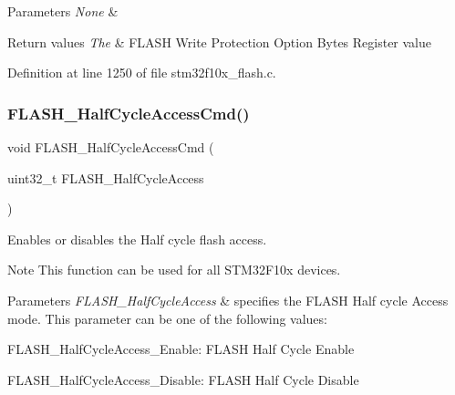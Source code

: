 \begin{DoxyParams}{Parameters}
{\em None} & \\
\hline
\end{DoxyParams}

\begin{DoxyRetVals}{Return values}
{\em The} & F\+L\+A\+SH Write Protection Option Bytes Register value \\
\hline
\end{DoxyRetVals}


Definition at line 1250 of file stm32f10x\+\_\+flash.\+c.

\mbox{\label{group___f_l_a_s_h___exported___functions_ga978103a57b37920ac01128e999f9ece6}} 
\subsubsection{\texorpdfstring{F\+L\+A\+S\+H\+\_\+\+Half\+Cycle\+Access\+Cmd()}{FLASH\_HalfCycleAccessCmd()}}
{\footnotesize\ttfamily void F\+L\+A\+S\+H\+\_\+\+Half\+Cycle\+Access\+Cmd (\begin{DoxyParamCaption}\item[{uint32\+\_\+t}]{F\+L\+A\+S\+H\+\_\+\+Half\+Cycle\+Access }\end{DoxyParamCaption})}



Enables or disables the Half cycle flash access. 

\begin{DoxyNote}{Note}
This function can be used for all S\+T\+M32\+F10x devices. 
\end{DoxyNote}

\begin{DoxyParams}{Parameters}
{\em F\+L\+A\+S\+H\+\_\+\+Half\+Cycle\+Access} & specifies the F\+L\+A\+SH Half cycle Access mode. This parameter can be one of the following values\+: \begin{DoxyItemize}
\item F\+L\+A\+S\+H\+\_\+\+Half\+Cycle\+Access\+\_\+\+Enable\+: F\+L\+A\+SH Half Cycle Enable \item F\+L\+A\+S\+H\+\_\+\+Half\+Cycle\+Access\+\_\+\+Disable\+: F\+L\+A\+SH Half Cycle Disable \end{DoxyItemize}
\\
\hline
\end{DoxyParams}

